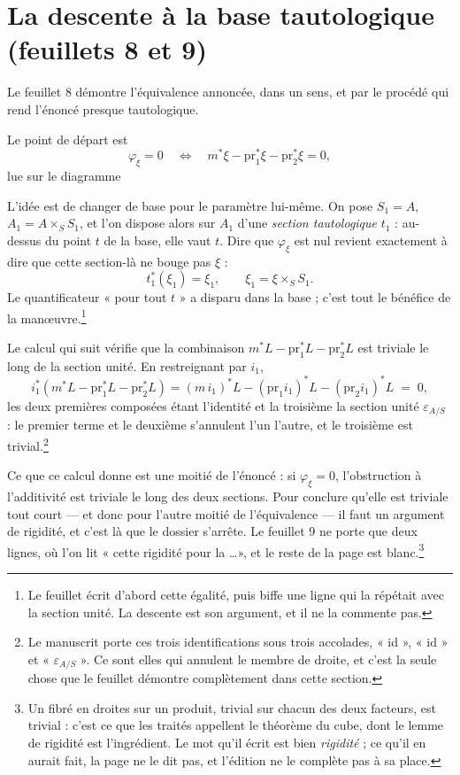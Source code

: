 \documentclass[11pt,a4paper]{article}
\begin{document}
\section*{La descente à la base tautologique (feuillets 8 et 9)}

Le feuillet 8 démontre l'équivalence annoncée, dans un sens, et par le procédé
qui rend l'énoncé presque tautologique.

Le point de départ est
\[
  \varphi_{\xi} = 0
  \quad \Longleftrightarrow \quad
  m^{*}\xi - \mathrm{pr}_{1}^{*}\xi - \mathrm{pr}_{2}^{*}\xi = 0,
\]
lue sur le diagramme


L'idée est de changer de base pour le paramètre lui-même. On pose $S_{1} = A$,
$A_{1} = A \times_{S} S_{1}$, et l'on dispose alors sur $A_{1}$ d'une
\emph{section tautologique} $t_{1}$ : au-dessus du point $t$ de la base, elle
vaut $t$. Dire que $\varphi_{\xi}$ est nul revient exactement à dire que cette
section-là ne bouge pas $\xi$ :
\[
  t_{1}^{*}(\xi_{1}) = \xi_{1}, \qquad \xi_{1} = \xi \times_{S} S_{1}.
\]
Le quantificateur « pour tout $t$ » a disparu dans la base ; c'est tout le
bénéfice de la manœuvre.\footnote{Le feuillet écrit d'abord cette égalité,
puis biffe une ligne qui la répétait avec la section unité. La descente est
son argument, et il ne la commente pas.}

Le calcul qui suit vérifie que la combinaison
$m^{*}L - \mathrm{pr}_{1}^{*}L - \mathrm{pr}_{2}^{*}L$ est triviale le long de
la section unité. En restreignant par $i_{1}$,
\[
  i_{1}^{*}\!\left(m^{*}L - \mathrm{pr}_{1}^{*}L - \mathrm{pr}_{2}^{*}L\right)
  = (m\,i_{1})^{*}L - (\mathrm{pr}_{1} i_{1})^{*}L
  - (\mathrm{pr}_{2} i_{1})^{*}L \;=\; 0,
\]
les deux premières composées étant l'identité et la troisième la section unité
$\varepsilon_{A/S}$ : le premier terme et le deuxième s'annulent l'un l'autre,
et le troisième est trivial.\footnote{Le manuscrit porte ces trois
identifications sous trois accolades, « id », « id » et
« $\varepsilon_{A/S}$ ». Ce sont elles qui annulent le membre de droite, et
c'est la seule chose que le feuillet démontre complètement dans cette
section.}

Ce que ce calcul donne est une moitié de l'énoncé : si $\varphi_{\xi} = 0$,
l'obstruction à l'additivité est triviale le long des deux sections. Pour
conclure qu'elle est triviale tout court — et donc pour l'autre moitié de
l'équivalence — il faut un argument de rigidité, et c'est là que le dossier
s'arrête. Le feuillet 9 ne porte que deux lignes, où l'on lit « cette
rigidité pour la \ldots », et le reste de la page est blanc.\footnote{Un fibré
en droites sur un produit, trivial sur chacun des deux facteurs, est trivial :
c'est ce que les traités appellent le théorème du cube, dont le lemme de
rigidité est l'ingrédient. Le mot qu'il écrit est bien \emph{rigidité} ; ce
qu'il en aurait fait, la page ne le dit pas, et l'édition ne le complète pas
à sa place.}
\end{document}
